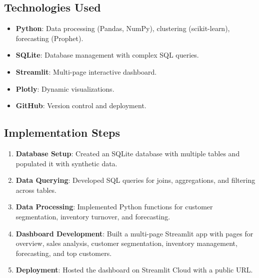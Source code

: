 \documentclass[12pt]{article}
\begin{document}
\subsection{Technologies Used}
\begin{itemize}
    \item \textbf{Python}: Data processing (Pandas, NumPy), clustering (scikit-learn), forecasting (Prophet).
    \item \textbf{SQLite}: Database management with complex SQL queries.
    \item \textbf{Streamlit}: Multi-page interactive dashboard.
    \item \textbf{Plotly}: Dynamic visualizations.
    \item \textbf{GitHub}: Version control and deployment.
\end{itemize}

\subsection{Implementation Steps}
\begin{enumerate}
    \item \textbf{Database Setup}: Created an SQLite database with multiple tables and populated it with synthetic data.
    \item \textbf{Data Querying}: Developed SQL queries for joins, aggregations, and filtering across tables.
    \item \textbf{Data Processing}: Implemented Python functions for customer segmentation, inventory turnover, and forecasting.
    \item \textbf{Dashboard Development}: Built a multi-page Streamlit app with pages for overview, sales analysis, customer segmentation, inventory management, forecasting, and top customers.
    \item \textbf{Deployment}: Hosted the dashboard on Streamlit Cloud with a public URL.
\end{enumerate}
\end{document}
